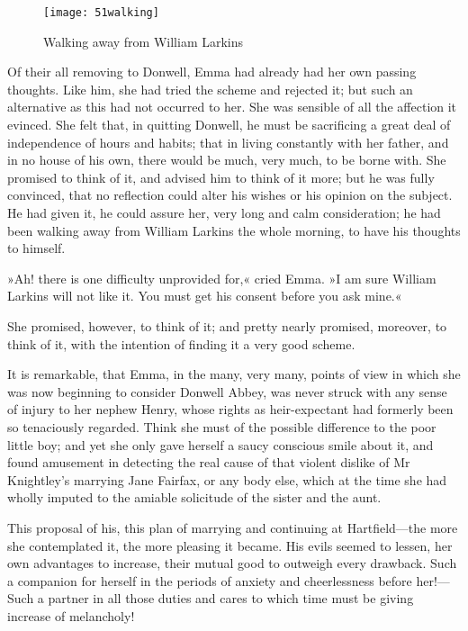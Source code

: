 \begin{figure}[tbph]
\centering
\texttt{[image: 51walking]}
\caption{Walking away from William Larkins}
\end{figure}

Of their all removing to Donwell, Emma had already had her own passing thoughts. Like him, she had tried the scheme and rejected it; but such an alternative as this had not occurred to her. She was sensible of all the affection it evinced. She felt that, in quitting Donwell, he must be sacrificing a great deal of independence of hours and habits; that in living constantly with her father, and in no house of his own, there would be much, very much, to be borne with. She promised to think of it, and advised him to think of it more; but he was fully convinced, that no reflection could alter his wishes or his opinion on the subject. He had given it, he could assure her, very long and calm consideration; he had been walking away from William Larkins the whole morning, to have his thoughts to himself.

»Ah! there is one difficulty unprovided for,« cried Emma. »I am sure William Larkins will not like it. You must get his consent before you ask mine.«

She promised, however, to think of it; and pretty nearly promised, moreover, to think of it, with the intention of finding it a very good scheme.

It is remarkable, that Emma, in the many, very many, points of view in which she was now beginning to consider Donwell Abbey, was never struck with any sense of injury to her nephew Henry, whose rights as heir-expectant had formerly been so tenaciously regarded. Think she must of the possible difference to the poor little boy; and yet she only gave herself a saucy conscious smile about it, and found amusement in detecting the real cause of that violent dislike of Mr Knightley's marrying Jane Fairfax, or any body else, which at the time she had wholly imputed to the amiable solicitude of the sister and the aunt.

This proposal of his, this plan of marrying and continuing at Hartfield—the more she contemplated it, the more pleasing it became. His evils seemed to lessen, her own advantages to increase, their mutual good to outweigh every drawback. Such a companion for herself in the periods of anxiety and cheerlessness before her!—Such a partner in all those duties and cares to which time must be giving increase of melancholy!

